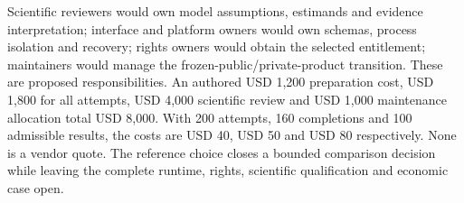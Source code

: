 Scientific reviewers would own model assumptions, estimands and evidence
interpretation; interface and platform owners would own schemas, process
isolation and recovery; rights owners would obtain the selected entitlement;
maintainers would manage the frozen-public/private-product transition. These
are proposed responsibilities. An authored USD 1,200 preparation cost,
USD 1,800 for all attempts, USD 4,000 scientific review and USD 1,000 maintenance
allocation total USD 8,000. With 200 attempts, 160 completions and 100 admissible
results, the costs are USD 40, USD 50 and USD 80 respectively. None is a vendor
quote. The reference choice closes a bounded comparison decision while leaving
the complete runtime, rights, scientific qualification and economic case open.
\citep{exec25_agena_choice}
